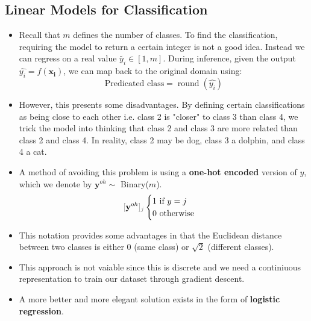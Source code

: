 \documentclass{article}
\newcommand{\tbf}[1]{\textbf{#1}}
\newcommand{\mbf}[1]{\mathbf{#1}}
\begin{document}
    \subsection{Linear Models for Classification}
    \begin{itemize}
        \item Recall that $m$ defines the number of classes. To find the classification, requiring the model to return a certain integer is not a good idea.
        Instead we can regress on a real value $\tilde{y_i} \in [1, m]$. During inference, given the output $\hat{y_i}=f(\mbf{x_i})$, 
        we can map back to the original domain using:
        \[\text{Predicated class} = \operatorname{round}(\hat{y_i})\]
        \item However, this presents some disadvantages. By defining certain classifications as being close to each other i.e. class 2 is "closer" to class 3 
        than class 4, we trick the model into thinking that class 2 and class 3 are more related than class 2 and class 4. In reality, class 2 may be dog, class 3 a dolphin,    
        and class 4 a cat.
        \item A method of avoiding this problem is using a \tbf{one-hot encoded} version of $y$, which we denote by $\mbf{y}^{oh} \sim$ Binary($m$).
        \[
        \textcolor{gray}{[}\mbf{y}^{oh}\textcolor{gray}{]_j}
        \begin{cases}
            1 \text{ if } y = j \\
            0 \text{ otherwise}
        \end{cases}
        \]
        \item This notation provides some advantages in that the Euclidean distance between two classes is either 0 (same class) or $\sqrt{2}$ (different classes).
        \item This approach is not vaiable since this is discrete and we need a continiuous representation to train our dataset through gradient descent.
        \item A more better and more elegant solution exists in the form of \tbf{logistic regression}.
    \end{itemize}
\end{document}
